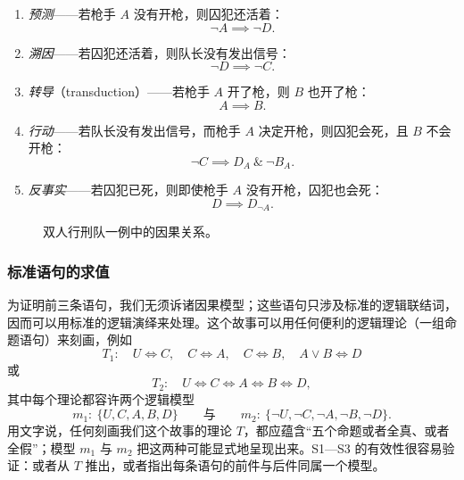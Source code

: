 \begin{enumerate}[label=\textbf{S\arabic*},leftmargin=3.4em,itemsep=0.55em,topsep=0.4em]
\item \emph{预测}——若枪手 $A$ 没有开枪，则囚犯还活着：
\[
\neg A\implies \neg D.
\]
\item \emph{溯因}——若囚犯还活着，则队长没有发出信号：
\[
\neg D\implies \neg C.
\]
\item \emph{转导}（transduction）——若枪手 $A$ 开了枪，则 $B$ 也开了枪：
\[
A\implies B.
\]
\item \emph{行动}——若队长没有发出信号，而枪手 $A$ 决定开枪，则囚犯会死，且 $B$ 不会开枪：
\[
\neg C\implies D_A\ \&\ \neg B_A.
\]
\item \emph{反事实}——若囚犯已死，则即使枪手 $A$ 没有开枪，囚犯也会死：
\[
D\implies D_{\neg A}.
\]
\end{enumerate}

\begin{figure}[htbp]
\centering
{}
\caption{双人行刑队一例中的因果关系。}
\label{fig:7.1}
\end{figure}

\subsubsection*{标准语句的求值}

为证明前三条语句，我们无须诉诸因果模型；这些语句只涉及标准的逻辑联结词，因而可以用标准的逻辑演绎来处理。这个故事可以用任何便利的逻辑理论（一组命题语句）来刻画，例如
\[
T_1:\quad U\iff C,\quad C\iff A,\quad C\iff B,\quad A\vee B\iff D
\]
或
\[
T_2:\quad U\iff C\iff A\iff B\iff D,
\]
其中每个理论都容许两个逻辑模型
\[
m_1:\ \{U,C,A,B,D\}\qquad\text{与}\qquad m_2:\ \{\neg U,\neg C,\neg A,\neg B,\neg D\}.
\]
用文字说，任何刻画我们这个故事的理论 $T$，都应蕴含“五个命题或者全真、或者全假”；模型 $m_1$ 与 $m_2$ 把这两种可能显式地呈现出来。S1—S3 的有效性很容易验证：或者从 $T$ 推出，或者指出每条语句的前件与后件同属一个模型。

